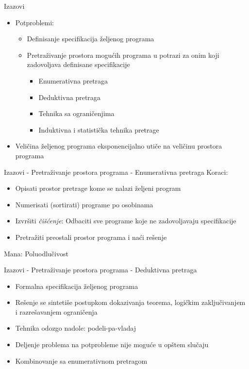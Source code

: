 

\begin{frame}{Izazovi}
    \begin{itemize}
        \item Potproblemi:
            \begin{itemize}
                \item Definisanje specifikacija željenog programa
                \item Pretraživanje prostora mogućih programa u potrazi za onim koji zadovoljava definisane specifikacije
                \begin{itemize}
                    \item Enumerativna pretraga
                    \item Deduktivna pretraga
                    \item Tehnika sa ograničenjima
                    \item Induktivna i statistička tehnika pretrage
                \end{itemize}
            \end{itemize}
        \item Veličina željenog programa eksponencijalno utiče na veličinu prostora programa
    \end{itemize}
\end{frame}


\begin{frame}{Izazovi - Pretraživanje prostora programa - Enumerativna pretraga}
    Koraci:
    \begin{itemize} 
        \item Opisati prostor pretrage kome se nalazi željeni program
        \item Numerisati (sortirati) programe po osobinama
        \item Izvršiti \emph{čišćenje}: Odbaciti sve programe koje ne zadovoljavaju specifikacije
        \item Pretražiti preostali prostor programa i naći rešenje
    \end{itemize}
     Mana: Poluodlučivost
\end{frame}

\begin{frame}{Izazovi - Pretraživanje prostora programa - Deduktivna pretraga}
    \begin{itemize}
        \item Formalna specifikacija željenog programa
        \item Rešenje se sintetiše postupkom dokazivanja teorema, logičkim zaključivanjem i razrešavanjem ograničenja
        \item Tehnika odozgo nadole: podeli-pa-vladaj
        \item Deljenje problema na potprobleme nije moguće u opštem slučaju
        \item Kombinovanje sa enumerativnom pretragom
    \end{itemize}
\end{frame}


